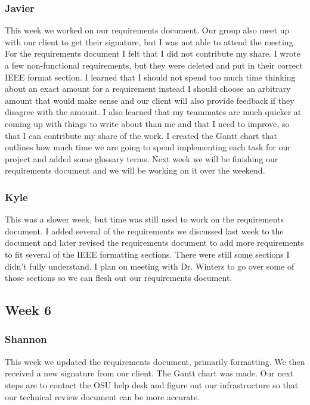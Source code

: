 \documentclass[letterpaper,10pt,serif, draftclsnofoot,onecolumn, compsoc, titlepage]{IEEEtran}
\begin{document}
\subsubsection{Javier}
This week we worked on our requirements document. Our group also meet up with our client to get their signature, but I was not able to attend the meeting. For the requirements document I felt that I did not contribute my share. I wrote a few non-functional requirements, but they were deleted and put in their correct IEEE format section. I learned that I should not spend too much time thinking about an exact amount for a requirement instead I should choose an arbitrary amount that would make sense and our client will also provide feedback if they disagree with the amount. I also learned that my teammates are much quicker at coming up with things to write about than me and that I need to improve, so that I can contribute my share of the work. I created the Gantt chart that outlines how much time we are going to spend implementing each task for our project and added some glossary terms. Next week we will be finishing our requirements document and we will be working on it over the weekend.
\subsubsection{Kyle}
This was a slower week, but time was still used to work on the requirements document. I added several of the requirements we discussed last week to the document and later revised the requirements document to add more requirements to fit several of the IEEE formatting sections. There were still some sections I didn't fully understand. I plan on meeting with Dr. Winters to go over some of those sections so we can flesh out our requirements document.
\subsection{Week 6}
\subsubsection{Shannon}
This week we updated the requirements document, primarily formatting. We then received a new signature from our client. The Gantt chart was made. Our next steps are to contact the OSU help desk and figure out our infrastructure so that our technical review document can be more accurate.
\end{document}
